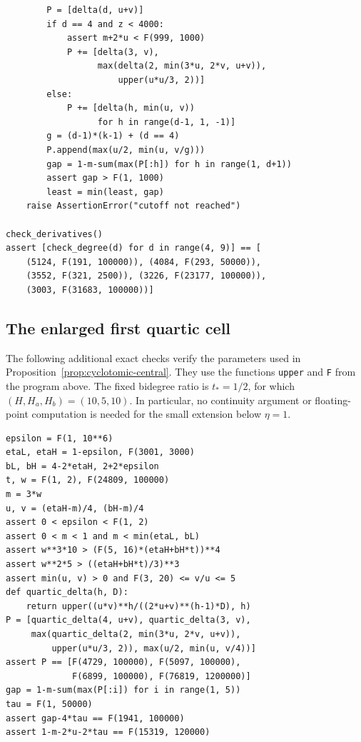 \begin{verbatim}
        P = [delta(d, u+v)]
        if d == 4 and z < 4000:
            assert m+2*u < F(999, 1000)
            P += [delta(3, v),
                  max(delta(2, min(3*u, 2*v, u+v)),
                      upper(u*u/3, 2))]
        else:
            P += [delta(h, min(u, v))
                  for h in range(d-1, 1, -1)]
        g = (d-1)*(k-1) + (d == 4)
        P.append(max(u/2, min(u, v/g)))
        gap = 1-m-sum(max(P[:h]) for h in range(1, d+1))
        assert gap > F(1, 1000)
        least = min(least, gap)
    raise AssertionError("cutoff not reached")

check_derivatives()
assert [check_degree(d) for d in range(4, 9)] == [
    (5124, F(191, 100000)), (4084, F(293, 50000)),
    (3552, F(321, 2500)), (3226, F(23177, 100000)),
    (3003, F(31683, 100000))]
\end{verbatim}
\endgroup

\subsection{The enlarged first quartic cell}
\label{app:quartic-extension}

The following additional exact checks verify the parameters used in
Proposition~\ref{prop:cyclotomic-central}. They use the functions
\texttt{upper} and \texttt{F} from the program above. The fixed
bidegree ratio is $t_*=1/2$, for which
$(H,H_a,H_b)=(10,5,10)$. In particular, no continuity argument or
floating-point computation is needed for the small extension below
$\eta=1$.

\begingroup\footnotesize
\begin{verbatim}
epsilon = F(1, 10**6)
etaL, etaH = 1-epsilon, F(3001, 3000)
bL, bH = 4-2*etaH, 2+2*epsilon
t, w = F(1, 2), F(24809, 100000)
m = 3*w
u, v = (etaH-m)/4, (bH-m)/4
assert 0 < epsilon < F(1, 2)
assert 0 < m < 1 and m < min(etaL, bL)
assert w**3*10 > (F(5, 16)*(etaH+bH*t))**4
assert w**2*5 > ((etaH+bH*t)/3)**3
assert min(u, v) > 0 and F(3, 20) <= v/u <= 5
def quartic_delta(h, D):
    return upper((u*v)**h/((2*u+v)**(h-1)*D), h)
P = [quartic_delta(4, u+v), quartic_delta(3, v),
     max(quartic_delta(2, min(3*u, 2*v, u+v)),
         upper(u*u/3, 2)), max(u/2, min(u, v/4))]
assert P == [F(4729, 100000), F(5097, 100000),
             F(6899, 100000), F(76819, 1200000)]
gap = 1-m-sum(max(P[:i]) for i in range(1, 5))
tau = F(1, 50000)
assert gap-4*tau == F(1941, 100000)
assert 1-m-2*u-2*tau == F(15319, 120000)
\end{verbatim}
\endgroup
